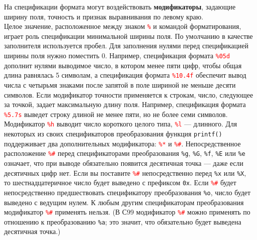 \documentclass {article}
\begin{document}
На спецификации формата могут воздействовать {\bfseries модификаторы}, задающие ширину поля, точность и признак выравнивания по левому краю.\\ Целое значение, расположенное между знаком  \texttt{\textcolor{red}{\%}} и командой форматирования, играет роль спецификации минимальной ширины поля. По умолчанию в качестве заполнителя используется пробел. Для заполнения нулями перед спецификацией ширины поля нужно поместить 0. Например, спецификация формата \texttt{\textcolor{red}{\%05d}} дополнит нулями выводимое число, в котором менее пяти цифр, чтобы общая длина равнялась 5 символам, а спецификация формата \texttt{\textcolor{red}{\%10.4f}} обеспечит вывод числа с четырьмя знаками после запятой в поле шириной не меньше десяти символов. Если модификатор точности применяется к строкам, число, следующее за точкой, задает максимальную длину поля. Например, спецификация формата \texttt{\textcolor{red}{\%5.7s}} выведет строку длиной не менее пяти, но не более семи символов. \\
Модификатор \texttt{\textcolor{red}{\%h}} выводит число короткого целого типа, \texttt{\textcolor{red}{\%l}} --- длинного.
Для некоторых из своих спецификаторов преобразования функция  \texttt{printf()} поддерживает два дополнительных модификатора: \texttt{\textcolor{red}{\%*}} и \texttt{\textcolor{red}{\%\#}}. 
Непосредственное расположение \texttt{\textcolor{red}{\%\#}} перед спецификаторами преобразования \texttt{\%g}, \texttt{\%G}, \texttt{\%f}, \texttt{\%E} или \texttt{\%e} означает, что при выводе обязательно появится десятичная точка — даже если десятичных цифр нет. Если вы поставите \texttt{\textcolor{red}{\%\#}} непосредственно перед \texttt{\%x} или \texttt{\%X}, то шестнадцатеричное число будет выведено с префиксом \texttt{0x}. Если \texttt{\textcolor{red}{\%\#}} будет непосредственно предшествовать спецификатору преобразования \texttt{\%o}, число будет выведено с ведущим нулем. К любым другим спецификаторам преобразования модификатор \texttt{\textcolor{red}{\%\#}} применять нельзя. (В С99 модификатор \texttt{\textcolor{red}{\%\#}} можно применять по отношению к преобразованию \texttt{\%a}; это значит, что обязательно будет выведена десятичная точка.) 
\end{document}
